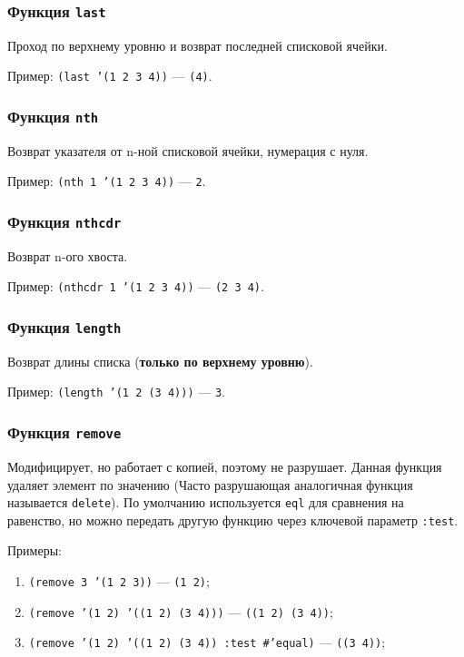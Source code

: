 \subsubsection*{Функция \texttt{last}}

Проход по верхнему уровню и возврат последней списковой ячейки.

Пример: \texttt{(last '(1 2 3 4))} --- \texttt{(4)}.

\subsubsection*{Функция \texttt{nth}}

Возврат указателя от n-ной списковой ячейки, нумерация с нуля.

Пример: \texttt{(nth 1 '(1 2 3 4))} --- \texttt{2}.

\subsubsection*{Функция \texttt{nthcdr}}

Возврат n-ого хвоста.

Пример: \texttt{(nthcdr 1 '(1 2 3 4))} --- \texttt{(2 3 4)}.

\subsubsection*{Функция \texttt{length}}

Возврат длины списка (\textbf{только по верхнему уровню}).

Пример: \texttt{(length '(1 2 (3 4)))} --- \texttt{3}.

\subsubsection*{Функция \texttt{remove}}

Модифицирует, но работает с копией, поэтому не разрушает. Данная функция удаляет элемент по значению (Часто разрушающая аналогичная функция называется \texttt{delete}). По умолчанию используется \texttt{eql} для сравнения на равенство, но можно передать другую функцию через ключевой параметр \texttt{:test}.

Примеры: 
\begin{enumerate}
	\item \texttt{(remove 3 '(1 2 3))} --- \texttt{(1 2)};
	\item \texttt{(remove '(1 2) '((1 2) (3 4)))} --- \texttt{((1 2) (3 4))};
	\item \texttt{(remove '(1 2) '((1 2) (3 4)) :test \#'equal)} --- \texttt{((3 4))};
\end{enumerate}

